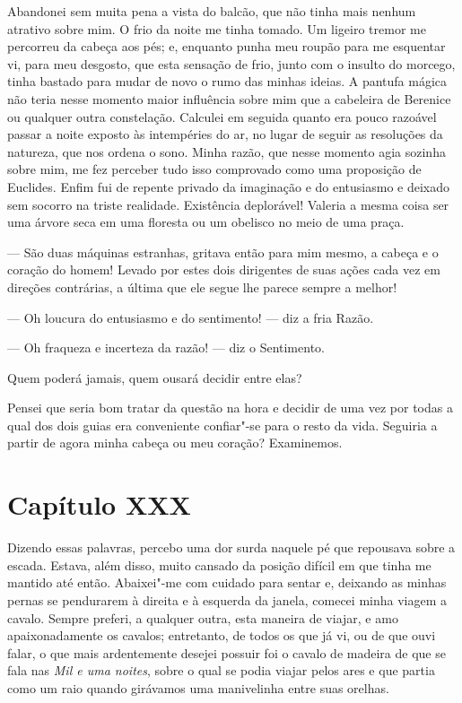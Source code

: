  Abandonei sem muita pena a vista do balcão, que não tinha mais nenhum
atrativo sobre mim. O frio da noite me tinha tomado. Um ligeiro tremor
me percorreu da cabeça aos pés; e, enquanto punha meu roupão para me
esquentar vi, para meu desgosto, que esta sensação de frio, junto com o
insulto do morcego, tinha bastado para mudar de novo o rumo das minhas
ideias. A pantufa mágica não teria nesse momento maior influência sobre
mim que a cabeleira de Berenice ou qualquer outra constelação. Calculei
em seguida quanto era pouco razoável passar a noite exposto às
intempéries do ar, no lugar de seguir as resoluções da natureza, que
nos ordena o sono. Minha razão, que nesse momento agia sozinha sobre
mim, me fez perceber tudo isso comprovado como uma proposição de
Euclides. Enfim fui de repente privado da imaginação e do entusiasmo e
deixado sem socorro na triste realidade. Existência deplorável! Valeria
a mesma coisa ser uma árvore seca em uma floresta ou um obelisco no
meio de uma praça.

 --- São duas máquinas estranhas, gritava então para mim mesmo, a cabeça
e o coração do homem! Levado por estes dois dirigentes de suas ações
cada vez em direções contrárias, a última que ele segue lhe parece
sempre a melhor! 

--- Oh loucura do entusiasmo e do sentimento! --- diz a fria Razão.

--- Oh fraqueza e incerteza da razão! --- diz o Sentimento. 

Quem poderá jamais, quem ousará decidir entre elas?

Pensei que seria bom tratar da questão na hora e decidir de uma vez por
todas a qual dos dois guias era conveniente confiar"-se para o resto da
vida. Seguiria a partir de agora minha cabeça ou meu coração?
Examinemos.

\section*{Capítulo XXX}

 Dizendo essas palavras, percebo uma dor surda naquele pé que repousava
sobre a escada. Estava, além disso, muito cansado da posição difícil em
que tinha me mantido até então. Abaixei"-me com cuidado para sentar e,
deixando as minhas pernas se pendurarem à direita e à esquerda da
janela, comecei minha viagem a cavalo. Sempre preferi, a qualquer
outra, esta maneira de viajar, e amo apaixonadamente os cavalos;
entretanto, de todos os que já vi, ou de que ouvi falar, o que mais
ardentemente desejei possuir foi o cavalo de madeira de que se fala nas
\textit{Mil e uma noites}, sobre o qual se podia viajar pelos ares e
que partia como um raio quando girávamos uma manivelinha entre suas
orelhas.


